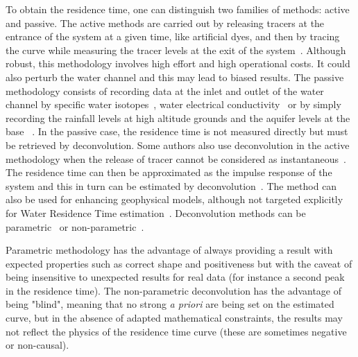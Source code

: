 \documentclass[]{elsarticle} %
\begin{document}
To obtain the residence time, one can distinguish two families of methods: active and passive. The active methods are carried out by releasing tracers at the entrance of the system at a given time, like artificial dyes, and then by tracing the curve while measuring the tracer levels at the exit of the system~\cite{Z_Hydro_DZIKOWSKI1992697, Z_Hydro_WernerKadlec2000, Z_Hydro_PaynGooseff2008, Z_Hydro_Robinson2010}. Although robust, this methodology  involves high effort and high operational costs. It could also perturb the water channel and this may lead to biased results. The passive methodology consists of recording data at the inlet and outlet of the water channel by specific water isotopes~\cite{Z_Hydro_McGuireMcDonnell2006}, water electrical conductivity~\cite{Z_Hydro_Cirpka2007} or by simply recording the rainfall levels at high altitude grounds and the aquifer levels at the base ~\cite{Z_Hydro_Delbart_2014}. In the passive case, the residence time is not measured directly but must be retrieved by deconvolution. Some authors also use deconvolution in the active methodology when the release of tracer cannot be considered as instantaneous~\cite{Z_Hydro_McGuireMcDonnell2006, Z_Hydro_Cirpka2007, Z_Hydro_PaynGooseff2008}. The residence time can then be approximated as the impulse response of the system and this in turn can be estimated by deconvolution~\cite{Z_Hydro_Neuman1982, Skaggs1998, Fienen2006}. The method can also be used for enhancing geophysical models, although not targeted explicitly for Water Residence Time estimation~\cite{Z_Hydro_Zuo2012170}. Deconvolution methods can be parametric~\cite{Z_Hydro_NeumanDeMarsily1976, Long1999, Z_Hydro_Etcheverry2000, Z_Hydro_WernerKadlec2000, Luo2006, Z_Hydro_McGuireMcDonnell2006} or non-parametric~\cite{Z_Hydro_Neuman1982, Dietrich1993, Skaggs1998, Michalak2003, Z_Hydro_Cirpka2007, Fienen2008, Z_Hydro_Gooseff2011, Z_Hydro_Delbart_2014}.

Parametric methodology has the advantage of always providing a result with expected properties such as correct shape and positiveness but with the caveat of being insensitive to unexpected results for real data (for instance a second peak in the residence time). The non-parametric deconvolution has the advantage of being "blind", meaning that no strong \textit{a priori} are being set on the estimated curve, but in the absence of adapted mathematical constraints, the results may not reflect the physics of the residence time curve (these are sometimes negative or non-causal). 
\end{document}
